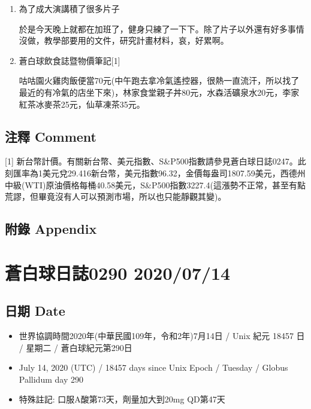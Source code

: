 \documentclass[a5paper, 11pt
]{book}
\providecommand{\tightlist}{%
  \setlength{\itemsep}{0pt}\setlength{\parskip}{0pt}}
\begin{document}
\begin{enumerate}
\def\labelenumi{\arabic{enumi}.}
\item
  為了成大演講積了很多片子

  於是今天晚上就都在加班了，健身只練了一下下。除了片子以外還有好多事情沒做，教學部要用的文件，研究計畫材料，哀，好累啊。
\item
  蒼白球飲食誌暨物價筆記{[}1{]}

  咕咕園火雞肉飯便當70元(中午跑去拿冷氣遙控器，很熱一直流汗，所以找了最近的有冷氣的店坐下來)，林家食堂親子丼80元，水森活礦泉水20元，李家紅茶冰麥茶25元，仙草凍茶35元。
\end{enumerate}

\hypertarget{ux6ce8ux91cb-comment-37}{%
\subsection{注釋 Comment}\label{ux6ce8ux91cb-comment-37}}

{[}1{]}
新台幣計價。有關新台幣、美元指數、S\&P500指數請參見蒼白球日誌0247。此刻匯率為1美元兌29.416新台幣，美元指數96.32，金價每盎司1807.59美元，西德州中級(WTI)原油價格每桶40.58美元，S\&P500指數3227.4(這漲勢不正常，甚至有點荒謬，但畢竟沒有人可以預測市場，所以也只能靜觀其變)。

\hypertarget{ux9644ux9304-appendix-37}{%
\subsection{附錄 Appendix}\label{ux9644ux9304-appendix-37}}

\hypertarget{ux84bcux767dux7403ux65e5ux8a8c0290-20200714}{%
\section{蒼白球日誌0290
2020/07/14}\label{ux84bcux767dux7403ux65e5ux8a8c0290-20200714}}

\hypertarget{ux65e5ux671f-date-38}{%
\subsection{日期 Date}\label{ux65e5ux671f-date-38}}

\begin{itemize}
\tightlist
\item
  世界協調時間2020年(中華民國109年，令和2年)7月14日 / Unix 紀元 18457 日
  / 星期二 / 蒼白球紀元第290日
\item
  July 14, 2020 (UTC) / 18457 days since Unix Epoch / Tuesday / Globus
  Pallidum day 290
\item
  特殊註記: 口服A酸第73天，劑量加大到20mg QD第47天
\end{itemize}
\end{document}
